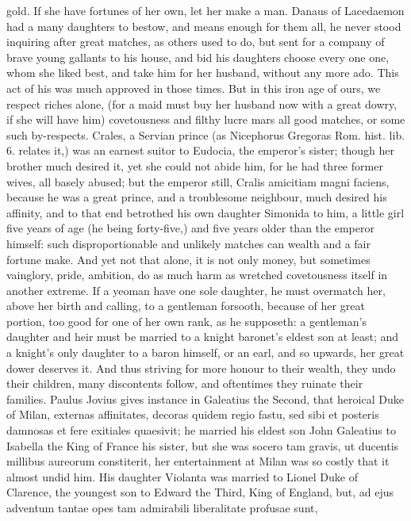 {gold. If she have fortunes of her own, let her make a man. Danaus of
Lacedaemon had a many daughters to bestow, and means enough for them
all, he never stood inquiring after great matches, as others used to
do, but sent for a company of brave young gallants to his house,
and bid his daughters choose every one one, whom she liked best, and
take him for her husband, without any more ado. This act of his was
much approved in those times. But in this iron age of ours, we respect
riches alone, (for a maid must buy her husband now with a great dowry,
if she will have him) covetousness and filthy lucre mars all good
matches, or some such by-respects. Crales, a Servian prince (as
Nicephorus Gregoras Rom. hist. lib. 6. relates it,) was an earnest
suitor to Eudocia, the emperor's sister; though her brother much
desired it, yet she could not abide him, for he had three former
wives, all basely abused; but the emperor still, Cralis amicitiam magni
faciens, because he was a great prince, and a troublesome neighbour,
much desired his affinity, and to that end betrothed his own daughter
Simonida to him, a little girl five years of age (he being forty-five,)
and five years older than the emperor himself: such
disproportionable and unlikely matches can wealth and a fair fortune
make. And yet not that alone, it is not only money, but sometimes
vainglory, pride, ambition, do as much harm as wretched covetousness
itself in another extreme. If a yeoman have one sole daughter, he must
overmatch her, above her birth and calling, to a gentleman forsooth,
because of her great portion, too good for one of her own rank, as he
supposeth: a gentleman's daughter and heir must be married to a knight
baronet's eldest son at least; and a knight's only daughter to a baron
himself, or an earl, and so upwards, her great dower deserves it. And
thus striving for more honour to their wealth, they undo their
children, many discontents follow, and oftentimes they ruinate their
families. Paulus Jovius gives instance in Galeatius the Second,
that heroical Duke of Milan, externas affinitates, decoras quidem regio
fastu, sed sibi et posteris damnosas et fere exitiales quaesivit; he
married his eldest son John Galeatius to Isabella the King of France
his sister, but she was socero tam gravis, ut ducentis millibus
aureorum constiterit, her entertainment at Milan was so costly that it
almost undid him. His daughter Violanta was married to Lionel Duke of
Clarence, the youngest son to Edward the Third, King of England, but,
ad ejus adventum tantae opes tam admirabili liberalitate profusae sunt,
}
